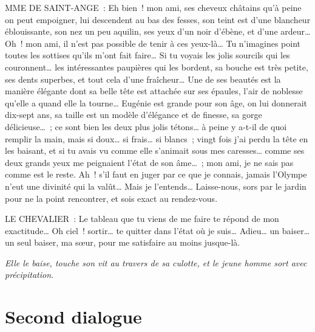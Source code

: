 \documentclass[french,twoside]{book} %
\begin{document}
MME DE SAINT-ANGE : Eh bien ! mon ami, ses cheveux châtains qu’à peine on peut empoigner, lui descendent au bas des fesses, son teint est d’une blancheur éblouissante, son nez un peu aquilin, ses yeux d’un noir d’ébène, et d’une ardeur… Oh ! mon ami, il n’est pas possible de tenir à ces yeux-là… Tu n’imagines point toutes les sottises qu’ils m’ont fait faire… Si tu voyais les jolis sourcils qui les couronnent… les intéressantes paupières qui les bordent, sa bouche est très petite, ses dents superbes, et tout cela d’une fraîcheur… Une de ses beautés est la manière élégante dont sa belle tête est attachée sur ses épaules, l’air de noblesse qu’elle a quand elle la tourne… Eugénie est grande pour son âge, on lui donnerait dix-sept ans, sa taille est un modèle d’élégance et de finesse, sa gorge délicieuse… ; ce sont bien les deux plus jolis tétons… à peine y a-t-il de quoi remplir la main, mais si doux… si frais… si blancs ; vingt fois j’ai perdu la tête en les baisant, et si tu avais vu comme elle s’animait sous mes caresses… comme ses deux grands yeux me peignaient l’état de son âme… ; mon ami, je ne sais pas comme est le reste. Ah ! s’il faut en juger par ce que je connais, jamais l’Olympe n’eut une divinité qui la valût… Mais je l’entends… Laisse-nous, sors par le jardin pour ne la point rencontrer, et sois exact au rendez-vous.\par
LE CHEVALIER : Le tableau que tu viens de me faire te répond de mon exactitude… Oh ciel ! sortir… te quitter dans l’état où je suis… Adieu… un baiser… un seul baiser, ma sœur, pour me satisfaire au moins jusque-là.\par
{\itshape Elle le baise, touche son vit au travers de sa culotte, et le jeune homme sort avec précipitation.}
\section[{Second dialogue}]{Second dialogue}
\label{d2}\renewcommand{\leftmark}{Second dialogue}
\end{document}
